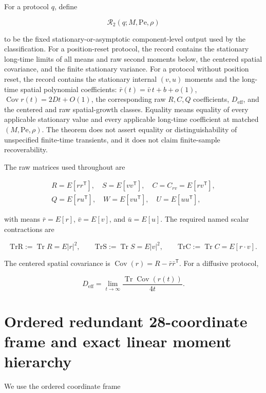 For a protocol \(q\), define

\[
\mathcal R_2(q;M,\mathrm{Pe},\rho)
\]

to be the fixed stationary-or-asymptotic component-level output used by the classification. For a position-reset protocol, the record contains the stationary long-time limits of all means and raw second moments below, the centered spatial covariance, and the finite stationary variance. For a protocol without position reset, the record contains the stationary internal \((v,u)\) moments and the long-time spatial polynomial coefficients: \(\bar r(t)=\bar v\,t+b+o(1)\), \(\operatorname{Cov}r(t)=2Dt+O(1)\), the corresponding raw \(R,C,Q\) coefficients, \(D_{\mathrm{eff}}\), and the centered and raw spatial-growth classes. Equality means equality of every applicable stationary value and every applicable long-time coefficient at matched \((M,\mathrm{Pe},\rho)\). The theorem does not assert equality or distinguishability of unspecified finite-time transients, and it does not claim finite-sample recoverability.

The raw matrices used throughout are

\[
\begin{gathered}
R=E[rr^\mathsf T],\quad S=E[vv^\mathsf T],\quad
C=C_{rv}=E[rv^\mathsf T],\\
Q=E[ru^\mathsf T],\quad W=E[vu^\mathsf T],\quad
U=E[uu^\mathsf T],
\end{gathered}
\]

with means \(\bar r=E[r]\), \(\bar v=E[v]\), and \(\bar u=E[u]\). The required named scalar contractions are

\[
\mathrm{TrR}:=\operatorname{Tr}R=E|r|^2,\qquad
\mathrm{TrS}:=\operatorname{Tr}S=E|v|^2,\qquad
\mathrm{TrC}:=\operatorname{Tr}C=E[r\mathbin{\cdot}v].
\]

The centered spatial covariance is \(\operatorname{Cov}(r)=R-\bar r\bar r^\mathsf T\). For a diffusive protocol,

\[
D_{\mathrm{eff}}
=\lim_{t\to\infty}\frac{\operatorname{Tr}\operatorname{Cov}(r(t))}{4t}.
\]

\section{Ordered redundant 28-coordinate frame and exact linear moment hierarchy}\label{s3.-ordered-redundant-28-coordinate-frame-and-exact-linear-moment-hierarchy}

We use the ordered coordinate frame

